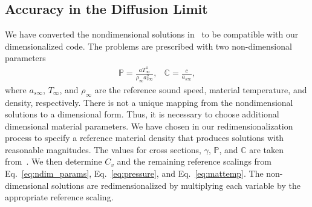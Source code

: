 \documentclass[preprint,12pt]{elsarticle}
\begin{document}
\subsection{Accuracy in the Diffusion Limit}

We have converted the nondimensional solutions in~\cite{mcclarren2} to be compatible with our dimensionalized code.  The
problems are prescribed with two non-dimensional parameters
\begin{equation}
    \label{eq:ndim_params}
    \begin{matrix}
        \mathbb{P} = {\displaystyle \frac{a T_{\infty}^4}{\rho_{\infty} a_{s\infty}^2} }, &  
        \mathbb{C} = {\displaystyle \frac{c}{a_{s\infty}} },
    \end{matrix}
\end{equation}
where $a_{s\infty}$, $T_{\infty}$, and $\rho_{\infty}$ are the reference sound speed, material temperature, and density, respectively.
There is not a unique mapping from the
nondimensional solutions to a dimensional form.  Thus, it is necessary to choose additional dimensional material parameters.  We have chosen in our redimensionalization process to specify a reference material
density that
produces solutions with reasonable magnitudes. 
The values for cross sections, $\gamma$, $\mathbb{P}$, and $\mathbb{C}$ are taken from~\cite{mcclarren2}.
We then determine $C_v$ and the remaining reference
scalings from Eq.~\eqref{eq:ndim_params}, Eq.~\eqref{eq:pressure}, and Eq.~\eqref{eq:mattemp}. The non-dimensional solutions are
redimensionalized by multiplying each variable by the appropriate reference scaling.
\end{document}
